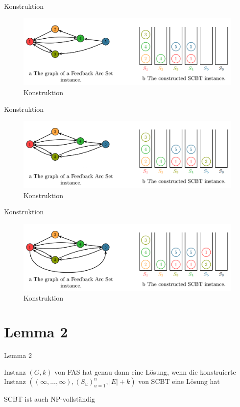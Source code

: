 \documentclass{beamer}
\begin{document}
\begin{frame}{Konstruktion}
\begin{figure}[ht]
		\includegraphics[width=\textwidth]{construct02}
		\caption{Konstruktion}
    \end{figure}
\end{frame}

\begin{frame}{Konstruktion}
\begin{figure}[ht]
		\includegraphics[width=\textwidth]{construct01}
		\caption{Konstruktion}
    \end{figure}
\end{frame}

\begin{frame}{Konstruktion}
\begin{figure}[ht]
		\includegraphics[width=\textwidth]{construct}
		\caption{Konstruktion}
    \end{figure}
\end{frame}

\section*{Lemma 2}
\begin{frame}{Lemma 2}
\begin{pointlist}
\item Instanz $(G,k)$ von FAS hat genau dann eine Lösung, wenn die konstruierte Instanz $((\infty, \dots, \infty), (S_u)_{u=1}^n, |E|+k)$ von SCBT eine Lösung hat
\begin{arrowlist}
\item SCBT ist auch NP-vollständig
\end{arrowlist}
\end{pointlist}
\end{frame}
\end{document}
